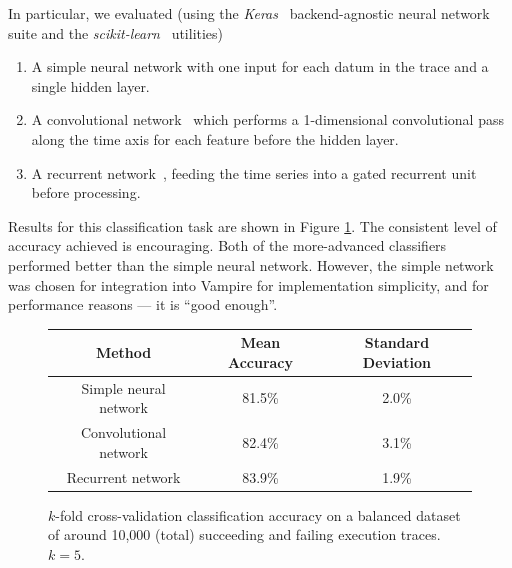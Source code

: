 \documentclass{llncs}
\begin{document}
In particular, we evaluated (using the \emph{Keras}~\cite{keras} backend-agnostic neural network suite and the \emph{scikit-learn}~\cite{scikit-learn} utilities)
\begin{enumerate}
	\item A simple neural network with one input for each datum in the trace and a single hidden layer.
	\item A convolutional network~\cite{cnn} which performs a 1-dimensional convolutional pass along the time axis for each feature before the hidden layer.
	\item A recurrent network~\cite{gru}, feeding the time series into a gated recurrent unit before processing.
\end{enumerate}
Results for this classification task are shown in Figure \ref{fig:xvalidation}. The consistent level of accuracy achieved is encouraging. 
Both of the more-advanced classifiers performed better than the simple neural network.
However, the simple network was chosen for integration into Vampire for implementation simplicity, and for performance reasons --- it is ``good enough''. 

\begin{figure}
	\centering
	\begin{tabular}{c c c}
		Method & Mean Accuracy & Standard Deviation\\
		\hline
		Simple neural network & 81.5\% & 2.0\%\\
		Convolutional network & 82.4\% & 3.1\%\\
		Recurrent network & 83.9\% & 1.9\%\\
	\end{tabular}
	\caption{\(k\)-fold cross-validation classification accuracy on a balanced dataset of around 10,000 (total) succeeding and failing execution traces. \(k=5\).}
	\label{fig:xvalidation}
\end{figure}

\end{document}
